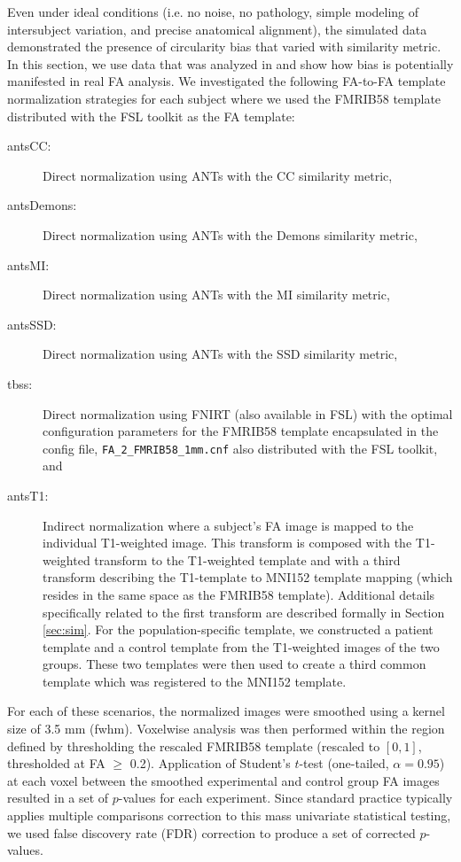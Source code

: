 \documentclass[final,5p,times,twocolumn]{elsarticle}
\begin{document}
Even under ideal conditions (i.e. no noise, no pathology, simple modeling of 
intersubject variation, and precise anatomical alignment), the simulated
data demonstrated the presence of circularity bias that varied with similarity
metric.  In this section, we use data that was analyzed in \cite{Stone2011}
and show how bias is potentially manifested in real FA analysis.  We investigated
the following FA-to-FA template normalization strategies for each subject where we used the  FMRIB58 template distributed with the FSL toolkit as the FA template:
\begin{description}
  \item[antsCC:] Direct normalization using ANTs with the CC similarity metric,
  \item[antsDemons:] Direct normalization using ANTs with the Demons similarity metric,
  \item[antsMI:] Direct normalization using ANTs with the MI similarity metric,
  \item[antsSSD:] Direct normalization using ANTs with the SSD similarity metric,
  \item[tbss:] Direct normalization using FNIRT (also available in FSL) with the
        optimal configuration parameters for the FMRIB58 template encapsulated
        in the config file, \verb#FA_2_FMRIB58_1mm.cnf# also distributed
        with the FSL toolkit, and
  \item[antsT1:] Indirect normalization where a subject's FA image is mapped to the individual
        T1-weighted image.  This transform is composed with the T1-weighted
        transform to the T1-weighted template and with a third transform describing the
        T1-template to MNI152 template mapping (which resides in the same space as the FMRIB58
        template). Additional details specifically related to the first transform
        are described formally in
        Section \ref{sec:sim}.  For the population-specific template, we constructed a patient                  
        template and a control template from the T1-weighted images of the two groups.  
        These two templates were then used to create a third common template which was 
        registered to the MNI152 template.  
\end{description}

For each of these scenarios, the normalized images were smoothed using
a kernel size of 3.5 mm (fwhm).  
Voxelwise analysis was then performed
within the region defined by thresholding the rescaled FMRIB58 template
(rescaled to $[0,1]$, thresholded at FA $\geq$ 0.2). Application of
 Student's $t$-test 
(one-tailed, $\alpha = 0.95$)
 at each voxel between the smoothed experimental and control group
 FA images
resulted in a set of $p$-values for each experiment.  Since standard
practice typically applies multiple comparisons correction to this
mass univariate statistical testing, we used
false discovery rate (FDR) correction to produce a set of corrected
$p$-values.  
\end{document}
